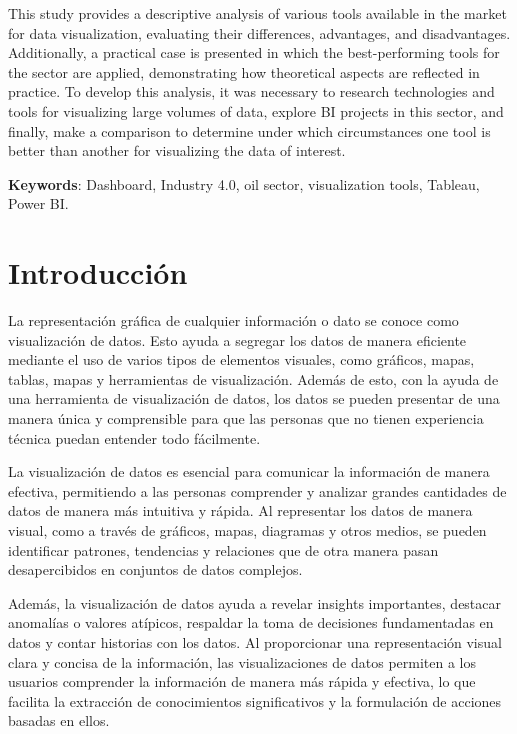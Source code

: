 \documentclass[
  11pt,
  bookmarksnumbered]{article}
\begin{document}
This study provides a descriptive analysis of various tools available in the market for data visualization, evaluating their differences, advantages, and disadvantages.
Additionally, a practical case is presented in which the best-performing tools for the sector are applied, demonstrating how theoretical aspects are reflected in practice.
To develop this analysis, it was necessary to research technologies and tools for visualizing large volumes of data, explore BI projects in this sector, and finally, make a comparison to determine under which circumstances one tool is better than another for visualizing the data of interest.

\textbf{Keywords}: Dashboard, Industry 4.0, oil sector, visualization tools, Tableau, Power BI.

\newpage

\hypertarget{introducciuxf3n}{%
\section{\texorpdfstring{\textbf{Introducción}}{Introducción}}\label{introducciuxf3n}}

La representación gráfica de cualquier información o dato se conoce como visualización de datos.
Esto ayuda a segregar los datos de manera eficiente mediante el uso de varios tipos de elementos visuales, como gráficos, mapas, tablas, mapas y herramientas de visualización.
Además de esto, con la ayuda de una herramienta de visualización de datos, los datos se pueden presentar de una manera única y comprensible para que las personas que no tienen experiencia técnica puedan entender todo fácilmente.

La visualización de datos es esencial para comunicar la información de manera efectiva, permitiendo a las personas comprender y analizar grandes cantidades de datos de manera más intuitiva y rápida.
Al representar los datos de manera visual, como a través de gráficos, mapas, diagramas y otros medios, se pueden identificar patrones, tendencias y relaciones que de otra manera pasan desapercibidos en conjuntos de datos complejos.

Además, la visualización de datos ayuda a revelar insights importantes, destacar anomalías o valores atípicos, respaldar la toma de decisiones fundamentadas en datos y contar historias con los datos.
Al proporcionar una representación visual clara y concisa de la información, las visualizaciones de datos permiten a los usuarios comprender la información de manera más rápida y efectiva, lo que facilita la extracción de conocimientos significativos y la formulación de acciones basadas en ellos.
\end{document}
